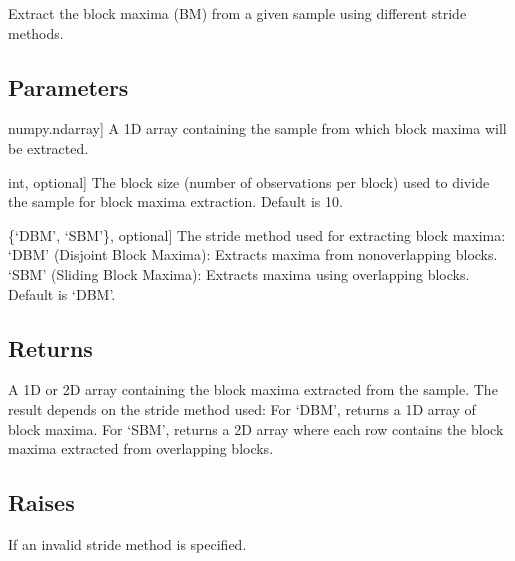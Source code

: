 \documentclass[a4paper,11pt,openany,english]{sphinxmanual}
\begin{document}
\begin{fulllineitems}
\label{\detokenize{api_bootstrap:xtremes.bootstrap.circmax}}
\pysigstartsignatures
{}
\pysigstopsignatures
\sphinxAtStartPar
Extract the block maxima (BM) from a given sample using different stride methods.


\subsection{Parameters}
\label{\detokenize{api_bootstrap:id7}}\begin{description}
\sphinxlineitem{sample}{[}numpy.ndarray{]}
\sphinxAtStartPar
A 1D array containing the sample from which block maxima will be extracted.

\sphinxlineitem{bs}{[}int, optional{]}
\sphinxAtStartPar
The block size (number of observations per block) used to divide the sample for block maxima extraction. Default is 10.

\sphinxlineitem{stride}{[}\{‘DBM’, ‘SBM’\}, optional{]}
\sphinxAtStartPar
The stride method used for extracting block maxima:
\sphinxhyphen{} ‘DBM’ (Disjoint Block Maxima): Extracts maxima from non\sphinxhyphen{}overlapping blocks.
\sphinxhyphen{} ‘SBM’ (Sliding Block Maxima): Extracts maxima using overlapping blocks. Default is ‘DBM’.

\end{description}


\subsection{Returns}
\label{\detokenize{api_bootstrap:id8}}\begin{description}
\sphinxAtStartPar
A 1D or 2D array containing the block maxima extracted from the sample. The result depends on the stride method used:
\sphinxhyphen{} For ‘DBM’, returns a 1D array of block maxima.
\sphinxhyphen{} For ‘SBM’, returns a 2D array where each row contains the block maxima extracted from overlapping blocks.

\end{description}


\subsection{Raises}
\label{\detokenize{api_bootstrap:raises}}\begin{description}
\sphinxAtStartPar
If an invalid stride method is specified.


\end{description}
\end{fulllineitems}
\end{document}
